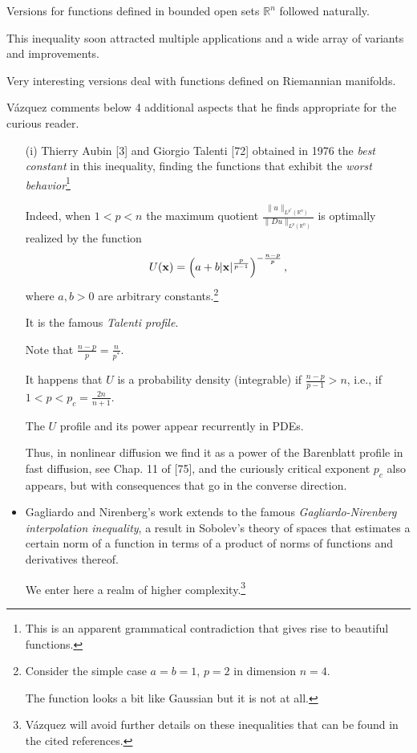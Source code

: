 \documentclass{article}
\begin{document}
Versions for functions defined in bounded open sets $\mathbb{R}^n$ followed naturally.

This inequality soon attracted multiple applications and a wide array of variants and improvements.

Very interesting versions deal with functions defined on Riemannian manifolds.

V\'azquez comments below 4 additional aspects that he finds appropriate for the curious reader.
\begin{itemize}
	\item[(i)] Thierry Aubin [3] and Giorgio Talenti [72] obtained in 1976 the \textit{best constant} in this inequality, finding the functions that exhibit the \textit{worst behavior}\footnote{This is an apparent grammatical contradiction that gives rise to beautiful functions.}
	
	Indeed, when $1 < p < n$ the maximum quotient $\frac{\|u\|_{L^{p^*}(\mathbb{R}^n)}}{\|Du\|_{L^p(\mathbb{R}^n)}}$ is optimally realized by the function
	\begin{align*}
		U({\bf x}) = \left(a + b|{\bf x}|^{\frac{p}{p - 1}}\right)^{-\frac{n - p}{p}},
	\end{align*}
	where $a,b > 0$ are arbitrary constants.\footnote{Consider the simple case $a = b = 1$, $p = 2$ in dimension $n = 4$.
		
		The function looks a bit like Gaussian but it is not at all.}
	
	It is the famous \textit{Talenti profile}.
	
	Note that $\frac{n - p}{p} = \frac{n}{p^*}$.
	
	It happens that $U$ is a probability density (integrable) if $\frac{n - p}{p - 1} > n$, i.e., if $1 < p < p_c = \frac{2n}{n + 1}$.
	
	The $U$ profile and its power appear recurrently in PDEs.
	
	Thus, in nonlinear diffusion we find it as a power of the Barenblatt profile in fast diffusion, see Chap. 11 of [75], and the curiously critical exponent $p_c$ also appears, but with consequences that go in the converse direction.
	\item Gagliardo and Nirenberg's work extends to the famous \textit{Gagliardo-Nirenberg interpolation inequality}, a result in Sobolev's theory of spaces that estimates a certain norm of a function in terms of a product of norms of functions and derivatives thereof.
	
	We enter here a realm of higher complexity.\footnote{V\'azquez will avoid further details on these inequalities that can be found in the cited references.}
	

\end{itemize}
\end{document}
